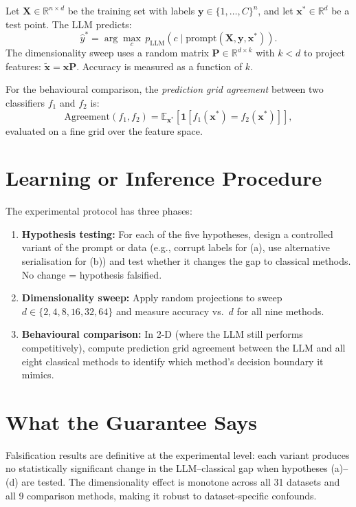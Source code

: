 \documentclass[10pt,twocolumn]{article}
\begin{document}
Let $\mathbf{X} \in \mathbb{R}^{n \times d}$ be the training set with labels
$\mathbf{y} \in \{1,\ldots,C\}^n$, and let $\mathbf{x}^* \in \mathbb{R}^d$ be
a test point. The LLM predicts:
\[
\hat{y}^* = \arg\max_{c}\, p_{\mathrm{LLM}}(c \mid \mathrm{prompt}(\mathbf{X}, \mathbf{y}, \mathbf{x}^*)).
\]
The dimensionality sweep uses a random matrix $\mathbf{P} \in \mathbb{R}^{d \times k}$
with $k < d$ to project features: $\tilde{\mathbf{x}} = \mathbf{x}\mathbf{P}$.
Accuracy is measured as a function of $k$.

For the behavioural comparison, the \emph{prediction grid agreement} between
two classifiers $f_1$ and $f_2$ is:
\[
\mathrm{Agreement}(f_1, f_2)
= \mathbb{E}_{\mathbf{x}^*}\!\left[\mathbf{1}\!\left[f_1(\mathbf{x}^*) = f_2(\mathbf{x}^*)\right]\right],
\]
evaluated on a fine grid over the feature space.

\section{Learning or Inference Procedure}

The experimental protocol has three phases:

\begin{enumerate}[itemsep=2pt,parsep=0pt]
  \item \textbf{Hypothesis testing:} For each of the five hypotheses, design a
    controlled variant of the prompt or data (e.g., corrupt labels for (a), use
    alternative serialisation for (b)) and test whether it changes the gap to classical
    methods. No change = hypothesis falsified.
  \item \textbf{Dimensionality sweep:} Apply random projections to sweep $d \in
    \{2, 4, 8, 16, 32, 64\}$ and measure accuracy vs.\ $d$ for all nine methods.
  \item \textbf{Behavioural comparison:} In 2-D (where the LLM still performs
    competitively), compute prediction grid agreement between the LLM and all
    eight classical methods to identify which method's decision boundary it mimics.
\end{enumerate}

\section{What the Guarantee Says}

Falsification results are definitive at the experimental level: each variant
produces no statistically significant change in the LLM--classical gap when
hypotheses (a)--(d) are tested. The dimensionality effect is monotone across all
31 datasets and all 9 comparison methods, making it robust to dataset-specific
confounds.
\end{document}
